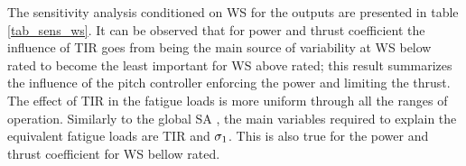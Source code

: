 \documentclass[preprint,12pt]{elsarticle}
\begin{document}
The sensitivity analysis conditioned on WS for the outputs are presented in table \ref{tab_sens_ws}. It can be observed that for power and thrust coefficient the influence of TIR goes from being the main source of variability at WS below rated to become the least important for WS above rated; this result summarizes the influence of the pitch controller enforcing the power and limiting the thrust. The effect of TIR in the fatigue loads is more uniform through all the ranges of operation. Similarly to the global SA , the main variables required to explain the equivalent fatigue loads are TIR and $\sigma_{1}$. This is also true for the power and thrust coefficient for WS bellow rated.

\begin{table}[!h]
\begin{centering}
\end{centering}
\end{table}
\end{document}
